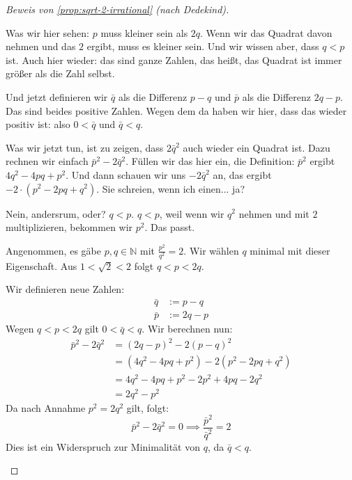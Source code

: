 \begin{proof}[Beweis von \cref{prop:sqrt-2-irrational} (nach Dedekind)]
\begin{spoken-clean}[00:45:42 - 00:48:12]
Was wir hier sehen: $p$ muss kleiner sein als $2q$. Wenn wir das Quadrat davon nehmen und das $2$ ergibt, muss es kleiner sein. Und wir wissen aber, dass $q < p$ ist. Auch hier wieder: das sind ganze Zahlen, das heißt, das Quadrat ist immer größer als die Zahl selbst.

Und jetzt definieren wir $\bar{q}$ als die Differenz $p - q$ und $\bar{p}$ als die Differenz $2q - p$. Das sind beides positive Zahlen. Wegen dem da haben wir hier, dass das wieder positiv ist: also $0 < \bar{q}$ und $\bar{q} < q$.

Was wir jetzt tun, ist zu zeigen, dass $2\bar{q}^2$ auch wieder ein Quadrat ist. Dazu rechnen wir einfach $\bar{p}^2 - 2\bar{q}^2$. Füllen wir das hier ein, die Definition: $\bar{p}^2$ ergibt $4q^2 - 4pq + p^2$. Und dann schauen wir uns $-2\bar{q}^2$ an, das ergibt $-2 \cdot (p^2 - 2pq + q^2)$. Sie schreien, wenn ich einen... ja?
\end{spoken-clean}

\begin{student-interaction}
Nein, andersrum, oder? $q < p$. $q < p$, weil wenn wir $q^2$ nehmen und mit $2$ multiplizieren, bekommen wir $p^2$. Das passt.
\end{student-interaction}

\begin{math-stroke}
Angenommen, es gäbe $p, q \in \mathbb{N}$ mit $\frac{p^2}{q^2} = 2$. Wir wählen $q$ minimal mit dieser Eigenschaft. Aus $1 < \sqrt{2} < 2$ folgt $q < p < 2q$.

Wir definieren neue Zahlen:
\begin{align}
\bar{q} &:= p - q \label{eq:q-bar} \\
\bar{p} &:= 2q - p \label{eq:p-bar}
\end{align}
Wegen $q < p < 2q$ gilt $0 < \bar{q} < q$. Wir berechnen nun:
\begin{align*}
\bar{p}^2 - 2\bar{q}^2 &= (2q - p)^2 - 2(p - q)^2 \\
&= (4q^2 - 4pq + p^2) - 2(p^2 - 2pq + q^2) \\
&= 4q^2 - 4pq + p^2 - 2p^2 + 4pq - 2q^2 \\
&= 2q^2 - p^2
\end{align*}
Da nach Annahme $p^2 = 2q^2$ gilt, folgt:
\[ \bar{p}^2 - 2\bar{q}^2 = 0 \implies \frac{\bar{p}^2}{\bar{q}^2} = 2 \]
Dies ist ein Widerspruch zur Minimalität von $q$, da $\bar{q} < q$.
\end{math-stroke}
\end{proof}

